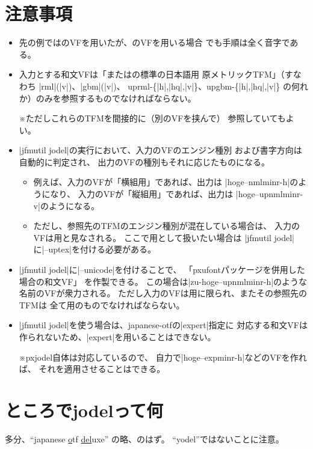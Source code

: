 \documentclass[uplatex,dvipdfmx,a4paper]{jsarticle}
\newcommand{\Pkg}[1]{\textsf{#1}}
\newcommand{\Note}{\par\noindent ※}
\begin{document}
\section{注意事項}
\label{sec:Notice}

\begin{itemize}
\item 先の例では{\pTeX}のVFを用いたが、{\upTeX}のVFを用いる場合
  でも手順は全く音字である。
\item 入力とする和文VFは「{\pTeX}または{\upTeX}の標準の日本語用
  原メトリックTFM」（すなわち
  |rml|(|v|)、|gbm|(|v|)、
  uprml-\{|h|,|hq|,|v|\}、upgbm-\{|h|,|hq|,|v|\}
  の何れか）のみを参照するものでなければならない。
  \Note ただしこれらのTFMを間接的に（別のVFを挟んで）
  参照していてもよい。
\item |jfmutil jodel|の実行において、入力のVFのエンジン種別
  および書字方向は自動的に判定され、
  出力のVFの種別もそれに応じたものになる。
  \begin{itemize}
  \item 例えば、入力のVFが「{\pTeX}横組用」であれば、出力は
    |hoge--nmlminr-h|のようになり、
    入力のVFが「{\upTeX}縦組用」であれば、出力は
    |hoge--upnmlminr-v|のようになる。
  \item ただし、参照先のTFMのエンジン種別が混在している場合は、
    入力のVFは{\pTeX}用と見なされる。
    ここで{\upTeX}用として扱いたい場合は
    |jfmutil jodel|に|--uptex|を付ける必要がある。
  \end{itemize}
\item |jfmutil jodel|に|--unicode|を付けることで、
  「\Pkg{pxufont}パッケージを併用した場合の和文VF」
  を作製できる。
  この場合は|zu-hoge--upnmlminr-h|のような名前のVFが衆力される。
  ただし入力のVFは{\upTeX}用に限られ、またその参照先のTFMは
  全て{\upTeX}用のものでなければならない。    
\item |jfmutil jodel|を使う場合は、\Pkg{japanese-otf}の|expert|指定に
  対応する和文VFは作られないため、|expert|を用いることはできない。
  \Note \Pkg{pxjodel}自体は対応しているので、
  自力で|hoge--expminr-h|などのVFを作れば、
  それを適用させることはできる。
\end{itemize}

\section{ところでjodelって何}
\label{sec:Jodel}

多分、“\underline{j}apanese \underline{o}tf \underline{del}uxe”
の略、のはず。
“yodel”ではないことに注意。

\end{document}
